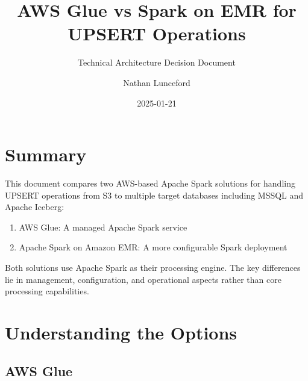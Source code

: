 \documentclass[
  letterpaper,
  DIV=11,
  numbers=noendperiod]{scrartcl}
\title{AWS Glue vs Spark on EMR for UPSERT Operations}
\subtitle{Technical Architecture Decision Document}
\author{Nathan Lunceford}
\date{2025-01-21}
\providecommand{\tightlist}{%
  \setlength{\itemsep}{0pt}\setlength{\parskip}{0pt}}\usepackage{longtable,booktabs,array}
\renewcommand*\contentsname{Table of contents}
\newcommand\contentsname{Table of contents}
\begin{document}
\maketitle

\renewcommand*\contentsname{Table of contents}
{
\hypersetup{linkcolor=}
\setcounter{tocdepth}{3}
\tableofcontents
}

\section{Summary}\label{summary}

This document compares two AWS-based Apache Spark solutions for handling
UPSERT operations from S3 to multiple target databases including MSSQL
and Apache Iceberg:

\begin{enumerate}
\def\labelenumi{\arabic{enumi}.}
\tightlist
\item
  AWS Glue: A managed Apache Spark service
\item
  Apache Spark on Amazon EMR: A more configurable Spark deployment
\end{enumerate}

\begin{tcolorbox}[enhanced jigsaw, colbacktitle=quarto-callout-note-color!10!white, coltitle=black, toprule=.15mm, colback=white, bottomrule=.15mm, colframe=quarto-callout-note-color-frame, left=2mm, leftrule=.75mm, opacityback=0, toptitle=1mm, opacitybacktitle=0.6, bottomtitle=1mm, titlerule=0mm, rightrule=.15mm, title=\textcolor{quarto-callout-note-color}{\faInfo}\hspace{0.5em}{Note}, breakable, arc=.35mm]

Both solutions use Apache Spark as their processing engine. The key
differences lie in management, configuration, and operational aspects
rather than core processing capabilities.

\end{tcolorbox}

\section{Understanding the Options}\label{understanding-the-options}

\subsection*{AWS Glue}\label{aws-glue}
\end{document}
